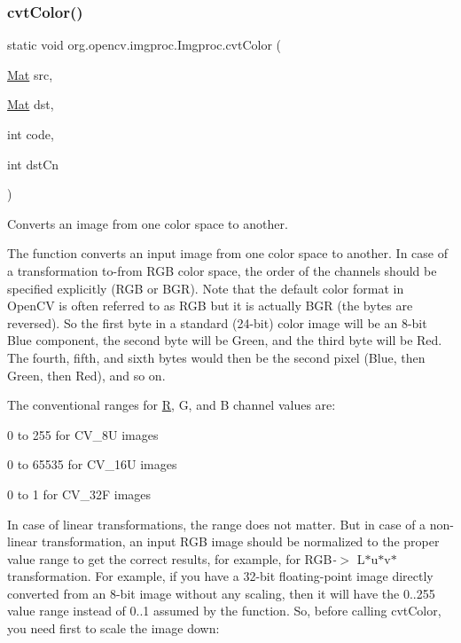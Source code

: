 \subsubsection{\texorpdfstring{cvt\+Color()}{cvtColor()}\hspace{0.1cm}{\footnotesize\ttfamily [1/2]}}
{\footnotesize\ttfamily static void org.\+opencv.\+imgproc.\+Imgproc.\+cvt\+Color (\begin{DoxyParamCaption}\item[{\mbox{\hyperlink{classorg_1_1opencv_1_1core_1_1_mat}{Mat}}}]{src,  }\item[{\mbox{\hyperlink{classorg_1_1opencv_1_1core_1_1_mat}{Mat}}}]{dst,  }\item[{int}]{code,  }\item[{int}]{dst\+Cn }\end{DoxyParamCaption})\hspace{0.3cm}{\ttfamily [static]}}

Converts an image from one color space to another.

The function converts an input image from one color space to another. In case of a transformation to-\/from R\+GB color space, the order of the channels should be specified explicitly (R\+GB or B\+GR). Note that the default color format in Open\+CV is often referred to as R\+GB but it is actually B\+GR (the bytes are reversed). So the first byte in a standard (24-\/bit) color image will be an 8-\/bit Blue component, the second byte will be Green, and the third byte will be Red. The fourth, fifth, and sixth bytes would then be the second pixel (Blue, then Green, then Red), and so on.

The conventional ranges for \mbox{\hyperlink{classorg_1_1opencv_1_1_r}{R}}, G, and B channel values are\+:


\begin{DoxyItemize}
\item 0 to 255 for {\ttfamily C\+V\+\_\+8U} images 
\item 0 to 65535 for {\ttfamily C\+V\+\_\+16U} images 
\item 0 to 1 for {\ttfamily C\+V\+\_\+32F} images 
\end{DoxyItemize}

In case of linear transformations, the range does not matter. But in case of a non-\/linear transformation, an input R\+GB image should be normalized to the proper value range to get the correct results, for example, for R\+GB{\itshape -\/$>$} L$\ast$u$\ast$v$\ast$ transformation. For example, if you have a 32-\/bit floating-\/point image directly converted from an 8-\/bit image without any scaling, then it will have the 0..255 value range instead of 0..1 assumed by the function. So, before calling {\ttfamily cvt\+Color}, you need first to scale the image down\+: {\ttfamily }

